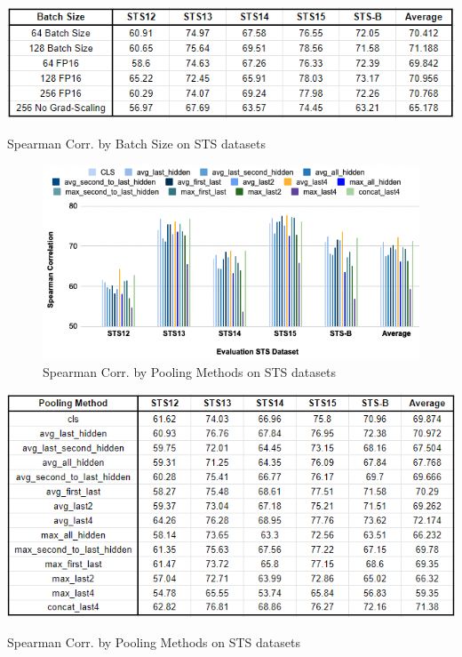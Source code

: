 \documentclass[10pt,twocolumn,letterpaper]{article}
\begin{document}
\begin{appendices}
\begin{table}[hbt!]
\centering
\includegraphics[scale=0.45]{images/Results-Batch-Size.png}
\caption{Spearman Corr. by Batch Size on STS datasets}
\label{fig:short}
\end{table}

\begin{figure}[hbt!]
\centering
\includegraphics[scale=0.35]{images/Results-Evaluation-Score-by-Pooling-Methods.png}
\caption{Spearman Corr. by Pooling Methods on STS datasets}
\label{fig:short}
\end{figure}

\begin{table}[hbt!]
\centering
\includegraphics[scale=0.45]{images/Results-Pooling-Method.png}
\caption{Spearman Corr. by Pooling Methods on STS datasets}
\label{fig:short}
\end{table}


\end{appendices}
\end{document}
